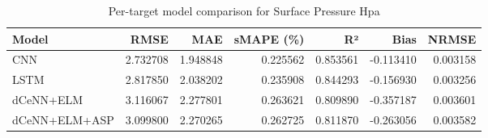 \begin{table}
\caption{Per-target model comparison for Surface Pressure Hpa}
\begin{tabular}{lrrrrrr}
\toprule
Model & RMSE & MAE & sMAPE (\%) & R² & Bias & NRMSE \\
\midrule
CNN & 2.732708 & 1.948848 & 0.225562 & 0.853561 & -0.113410 & 0.003158 \\
LSTM & 2.817850 & 2.038202 & 0.235908 & 0.844293 & -0.156930 & 0.003256 \\
dCeNN+ELM & 3.116067 & 2.277801 & 0.263621 & 0.809890 & -0.357187 & 0.003601 \\
dCeNN+ELM+ASP & 3.099800 & 2.270265 & 0.262725 & 0.811870 & -0.263056 & 0.003582 \\
\bottomrule
\end{tabular}
\end{table}
